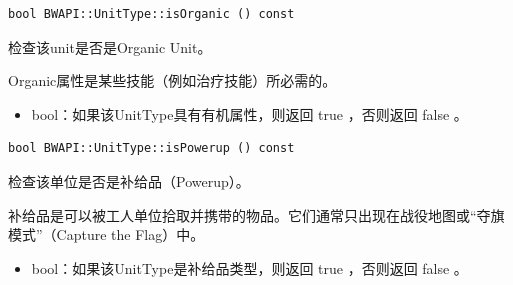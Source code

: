 \begin{tcolorbox}[colback=white, colframe=black!60!white, title=isOrganic(), arc=0mm]
    \begin{verbatim}
bool BWAPI::UnitType::isOrganic () const
    \end{verbatim}
    检查该unit是否是Organic Unit。\par Organic属性是某些技能（例如治疗技能）所必需的。
\begin{return}
\begin{itemize}
    \item bool：如果该UnitType具有有机属性，则返回   true  ，否则返回   false  。
\end{itemize}
\end{return}
\end{tcolorbox}


\begin{tcolorbox}[colback=white, colframe=black!60!white, title=isPowerup(), arc=0mm]
    \begin{verbatim}
bool BWAPI::UnitType::isPowerup () const
    \end{verbatim}
    检查该单位是否是补给品（Powerup）。\par 补给品是可以被工人单位拾取并携带的物品。它们通常只出现在战役地图或“夺旗模式”（Capture the Flag）中。
\begin{return}
\begin{itemize}
    \item bool：如果该UnitType是补给品类型，则返回   true  ，否则返回   false  。
\end{itemize}
\end{return}
\end{tcolorbox}


